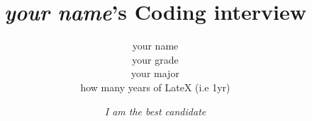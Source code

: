 \title{\emph{your name}'s Coding interview}

\author{
your name\\
your grade\\
your major\\
how many years of LateX (i.e 1yr)
}
\date{\small\emph{I am the best candidate}}

\maketitle
